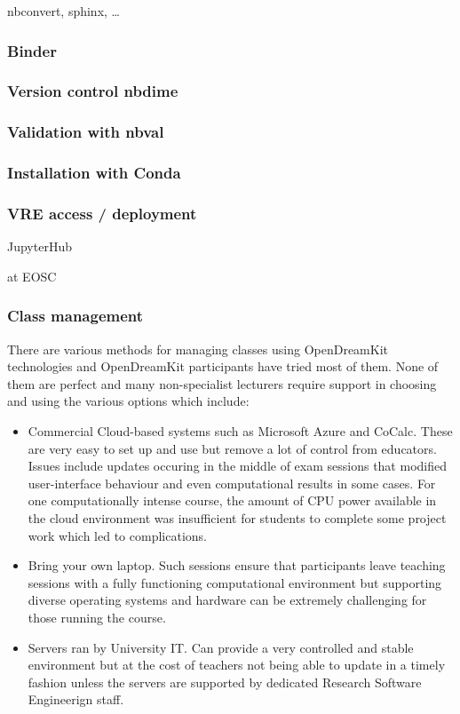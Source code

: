 \documentclass{deliverablereport}
\begin{document}
nbconvert, sphinx, \ldots{}

\subsubsection{Binder}

\subsubsection{Version control nbdime}

\subsubsection{Validation with nbval}

\subsubsection{Installation with Conda}

\subsubsection{VRE access / deployment}

JupyterHub

at EOSC

\subsubsection{Class management}

There are various methods for managing classes using OpenDreamKit
technologies and OpenDreamKit participants have tried most of them. None
of them are perfect and many non-specialist lecturers require support in
choosing and using the various options which include:

\begin{itemize}
\tightlist
\item
  Commercial Cloud-based systems such as Microsoft Azure and CoCalc.
  These are very easy to set up and use but remove a lot of control from
  educators. Issues include updates occuring in the middle of exam
  sessions that modified user-interface behaviour and even computational
  results in some cases. For one computationally intense course, the
  amount of CPU power available in the cloud environment was
  insufficient for students to complete some project work which led to
  complications.
\item
  Bring your own laptop. Such sessions ensure that participants leave
  teaching sessions with a fully functioning computational environment
  but supporting diverse operating systems and hardware can be extremely
  challenging for those running the course.
\item
  Servers ran by University IT. Can provide a very controlled and stable
  environment but at the cost of teachers not being able to update in a
  timely fashion unless the servers are supported by dedicated Research
  Software Engineerign staff.
\end{itemize}
\end{document}
